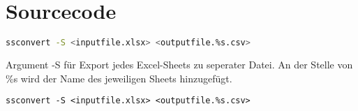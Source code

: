 
\chapter{Sourcecode}




	\begin{lstlisting}[language=Bash, label={code:xlsx2csv}, caption={Shell script um Excel-Sheets zu CSV-Dateien zu wandeln.}]
		ssconvert -S <inputfile.xlsx> <outputfile.%s.csv>
	\end{lstlisting}
	Argument -S für Export jedes Excel-Sheets zu seperater Datei. An der Stelle von \%s wird der Name des jeweiligen Sheets hinzugefügt. 

	\texttt{ssconvert -S <inputfile.xlsx> <outputfile.\%s.csv>} \\

